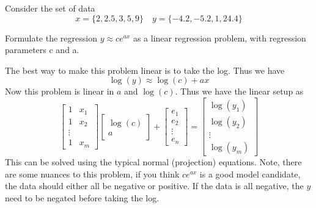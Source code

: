 \documentclass{homework}
\begin{document}
\begin{problem}[3-3]
  Consider the set of data
  \[ x = \{2,2.5,3,5,9\} \quad y = \{-4.2,-5.2,1,24.4\} \]
\end{problem}

\begin{problem}[3-6]
  Formulate the regression $y \approx ce^{ax}$ as a linear regression problem, with regression parameters c and a. 
\end{problem}

\begin{solution}
  The best way to make this problem linear is to take the log. Thus we have
  \[\log(y) \approx \log(c) + ax\]
  Now this problem is linear in $a$ and $\log(c)$.
  Thus we have the linear setup as
  $$
  \begin{bmatrix}
    1 & x_1 \\
    1 & x_2 \\
    \vdots \\
    1 & x_m
  \end{bmatrix}
  \begin{bmatrix}
    \log(c) \\
    a 
  \end{bmatrix}
  +
  \begin{bmatrix}
   e_1 \\
   e_2 \\
   \vdots \\
   e_n
  \end{bmatrix}
  =
  \begin{bmatrix}
    \log(y_1) \\
    \log(y_2) \\
    \vdots \\
    \log(y_m)
  \end{bmatrix}
  $$
  This can be solved using the typical normal (projection) equations. Note, there are some nuances to this problem, if you think $ce^{ax}$ is a good model candidate, the data should either all be negative or positive. If the data is all negative, the $y$ need to be negated before taking the log.
\end{solution}
\end{document}
